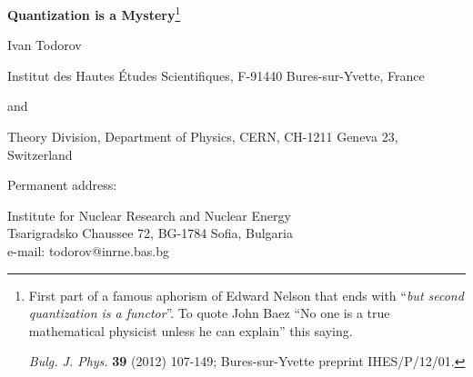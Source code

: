 \documentclass[12pt]{article}
\begin{document}
\def\vac{| 0 >}
\def\leftvac{< 0 |}
\def\C{\mathbb C}
\def\R{\mathbb R}
\def\S{\mathbb S}

\begin{center}

{\Large {\bf Quantization is a Mystery}}\footnote{First part of a famous
aphorism of Edward Nelson that ends with ``{\it but second quantization is a
functor}''. To quote John Baez \cite{B06} ``No one is a true mathematical
physicist unless he can explain'' this saying.

{\it Bulg. J. Phys.} {\bf 39} (2012) 107-149;
Bures-sur-Yvette preprint IHES/P/12/01.}

\vspace{4mm}

Ivan Todorov

Institut des Hautes \'Etudes Scientifiques, F-91440 Bures-sur-Yvette, France

and

Theory Division, Department of Physics, CERN, CH-1211 Geneva 23, Switzerland

Permanent address:
 
Institute for Nuclear Research and Nuclear Energy\\
Tsarigradsko Chaussee 72, BG-1784 Sofia, Bulgaria\\
e-mail: todorov@inrne.bas.bg 

\end{center}

\begin{abstract}

Expository notes which combine a historical survey of the development of quantum physics with a review of selected mathematical topics in quantization theory (addressed to students that are not complete novices in quantum mechanics).

After recalling in the introduction the early stages of the quantum revolution, and recapitulating 
in Sect. 2.1 some basic notions of symplectic geometry, we survey in Sect. 2.2 the 
so called {\it prequantization} thus preparing the ground for an outline of 
{\it geometric quantization} (Sect. 2.3). In Sect. 3 we apply the general theory
to the study of basic examples of {\it quantization of K\"ahler manifolds}. In Sect. 4 we review the Weyl and Wigner maps and the work of Groenewold and Moyal that laid the foundations of {\it quantum mechanics in phase space}, ending with a brief survey of the modern development of {\it deformation quantization}. Sect. 5
provides a review of {\it second quantization} and its mathematical interpretation. We point out that the treatment of (nonrelativistic) bound states requires going beyond the neat mathematical formalization of the concept of second quantization. An appendix is devoted to Pascual Jordan, the least known among the creators of  quantum mechanics and  the chief architect of the ``theory of quantized matter waves''.
\end{abstract}
\end{document}
